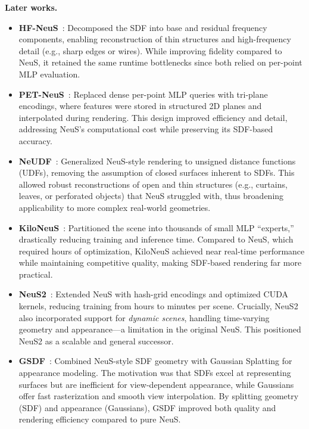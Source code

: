 \begin{enrichment}
\begin{enrichment}
    \medskip
    \textbf{Later works.}  
    \begin{itemize}
        \item \textbf{HF-NeuS}~\cite{wang2022_hf_neus}: Decomposed the SDF into base and residual frequency components, enabling reconstruction of thin structures and high-frequency detail (e.g., sharp edges or wires). While improving fidelity compared to NeuS, it retained the same runtime bottlenecks since both relied on per-point MLP evaluation.
        \item \textbf{PET-NeuS}~\cite{wang2023_pet_neus}: Replaced dense per-point MLP queries with tri-plane encodings, where features were stored in structured 2D planes and interpolated during rendering. This design improved efficiency and detail, addressing NeuS’s computational cost while preserving its SDF-based accuracy.
        \item \textbf{NeUDF}~\cite{liu2023_neudf}: Generalized NeuS-style rendering to unsigned distance functions (UDFs), removing the assumption of closed surfaces inherent to SDFs. This allowed robust reconstructions of open and thin structures (e.g., curtains, leaves, or perforated objects) that NeuS struggled with, thus broadening applicability to more complex real-world geometries.
        \item \textbf{KiloNeuS}~\cite{esposito2022_kiloneus}: Partitioned the scene into thousands of small MLP “experts,” drastically reducing training and inference time. Compared to NeuS, which required hours of optimization, KiloNeuS achieved near real-time performance while maintaining competitive quality, making SDF-based rendering far more practical.
        \item \textbf{NeuS2}~\cite{wang2023_neus2}: Extended NeuS with hash-grid encodings and optimized CUDA kernels, reducing training from hours to minutes per scene. Crucially, NeuS2 also incorporated support for \emph{dynamic scenes}, handling time-varying geometry and appearance—a limitation in the original NeuS. This positioned NeuS2 as a scalable and general successor.
        \item \textbf{GSDF}~\cite{yu2024_gsdf}: Combined NeuS-style SDF geometry with Gaussian Splatting for appearance modeling. The motivation was that SDFs excel at representing surfaces but are inefficient for view-dependent appearance, while Gaussians offer fast rasterization and smooth view interpolation. By splitting geometry (SDF) and appearance (Gaussians), GSDF improved both quality and rendering efficiency compared to pure NeuS. 
    \end{itemize} 
    

\end{enrichment}
\end{enrichment}
